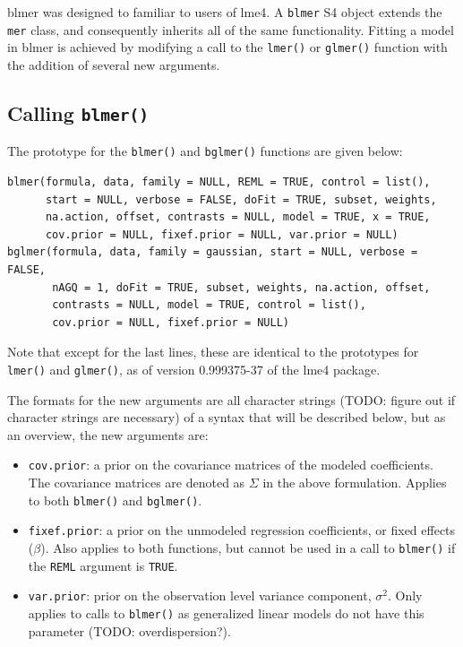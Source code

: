 \documentclass[10pt]{article}
\newcommand{\pkg}[1]{{\fontseries{b}\selectfont #1}}
\newcommand{\code}[1]{\texttt{#1}}
\begin{document}
\pkg{blmer} was designed to familiar to users of \pkg{lme4}. A \code{blmer} S4 object extends the \code{mer} class, and
consequently inherits all of the same functionality. Fitting a model
in \pkg{blmer} is achieved by modifying a call to the \code{lmer()} or \code{glmer()} function
with the addition of several new arguments.

\subsection[Calling blmer]{Calling \code{blmer()}}

The prototype for the \code{blmer()} and \code{bglmer()} functions are given below:

\begin{verbatim}
blmer(formula, data, family = NULL, REML = TRUE, control = list(),
      start = NULL, verbose = FALSE, doFit = TRUE, subset, weights,
      na.action, offset, contrasts = NULL, model = TRUE, x = TRUE,
      cov.prior = NULL, fixef.prior = NULL, var.prior = NULL)
bglmer(formula, data, family = gaussian, start = NULL, verbose = FALSE,
       nAGQ = 1, doFit = TRUE, subset, weights, na.action, offset,
       contrasts = NULL, model = TRUE, control = list(),
       cov.prior = NULL, fixef.prior = NULL)
\end{verbatim}

\noindent Note that except for the last lines, these are identical to
the prototypes for \code{lmer()} and \code{glmer()}, as of version
0.999375-37 of the \pkg{lme4} package.

The formats for the new arguments are all character strings (TODO:
figure out if character strings are necessary) of a
syntax that will be described below, but as an
overview, the new arguments are:

\begin{itemize}
\item \code{cov.prior}: a prior on the covariance matrices of the
  modeled coefficients. The covariance matrices are denoted as
  $\Sigma$ in the above formulation. Applies to both \code{blmer()} and \code{bglmer()}.
\item \code{fixef.prior}: a prior on the unmodeled regression
  coefficients, or fixed effects ($\beta$). Also applies to both functions, but
  cannot be used in a call to \code{blmer()} if the \code{REML}
  argument is \code{TRUE}.
\item \code{var.prior}: prior on the observation level variance
  component, $\sigma^2$. Only applies to calls to \code{blmer()} as
  generalized linear models do not have this parameter (TODO: overdispersion?).
\end{itemize}
\end{document}
